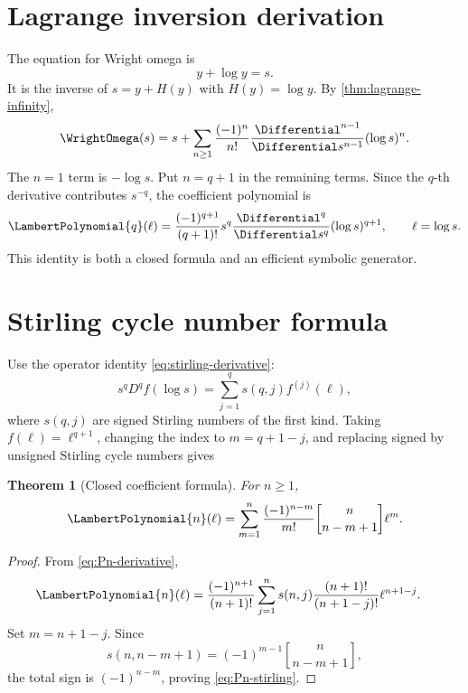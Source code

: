 \documentclass[11pt,openany]{book}
\theoremstyle{definition}
\theoremstyle{plain}
\newtheorem{theorem}{Theorem}[chapter]
\theoremstyle{remark}
\newcommand{\stirlingone}[2]{\genfrac{[}{]}{0pt}{}{#1}{#2}}
\begin{document}
\section{Lagrange inversion derivation}
The equation for Wright omega is
\[
 y+\log y=s.
\]
It is the inverse of \(s=y+H(y)\) with \(H(y)=\log y\). By \cref{thm:lagrange-infinity},
\begin{equation}\label{eq:omega-lagrange-again}
 \WrightOmega(s)=s+\sum_{n\ge1}\frac{(-1)^n}{n!}
 \frac{\Differential^{n-1}}{\Differential s^{n-1}}(\log s)^n.
\end{equation}
The \(n=1\) term is \(-\log s\). Put \(n=q+1\) in the remaining terms. Since the \(q\)-th derivative contributes \(s^{-q}\), the coefficient polynomial is
\begin{equation}\label{eq:Pn-derivative}
 \LambertPolynomial{q}(\ell)=
 \frac{(-1)^{q+1}}{(q+1)!}
 s^q\frac{\Differential^q}{\Differential s^q}(\log s)^{q+1},
 \qquad \ell=\log s.
\end{equation}
This identity is both a closed formula and an efficient symbolic generator.

\section{Stirling cycle number formula}
Use the operator identity \cref{eq:stirling-derivative}:
\[
 s^qD^q f(\log s)=\sum_{j=1}^q s(q,j)f^{(j)}(\ell),
\]
where \(s(q,j)\) are signed Stirling numbers of the first kind. Taking \(f(\ell)=\ell^{q+1}\), changing the index to \(m=q+1-j\), and replacing signed by unsigned Stirling cycle numbers gives
\begin{theorem}[Closed coefficient formula]\label{thm:Pn-stirling}
For \(n\ge1\),
\begin{equation}\label{eq:Pn-stirling}
 \LambertPolynomial{n}(\ell)=
 \sum_{m=1}^{n}
 \frac{(-1)^{n-m}}{m!}
 \stirlingone{n}{n-m+1}\ell^m.
\end{equation}
\end{theorem}

\begin{proof}
From \cref{eq:Pn-derivative},
\begin{align*}
 \LambertPolynomial{n}(\ell)
 &=\frac{(-1)^{n+1}}{(n+1)!}
 \sum_{j=1}^n s(n,j)
 \frac{(n+1)!}{(n+1-j)!}\ell^{n+1-j}.
\end{align*}
Set \(m=n+1-j\). Since
\[
 s(n,n-m+1)=(-1)^{m-1}\stirlingone{n}{n-m+1},
\]
the total sign is \((-1)^{n-m}\), proving \cref{eq:Pn-stirling}.
\end{proof}
\end{document}
